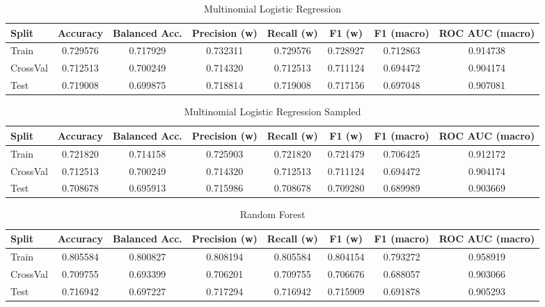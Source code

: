 \begin{table}[H]
	\centering
	\caption{Multinomial Logistic Regression}
	\begin{adjustbox}{max width=\textwidth}
		\begin{tabular}{lccccccc}
			\toprule
			Split & Accuracy & Balanced Acc. & Precision (w) & Recall (w) & F1 (w) & F1 (macro) & ROC AUC (macro) \\
			\midrule
			Train & 0.729576 & 0.717929 & 0.732311 & 0.729576 & 0.728927 & 0.712863 & 0.914738 \\
			CrossVal & 0.712513 & 0.700249 & 0.714320 & 0.712513 & 0.711124 & 0.694472 & 0.904174 \\
			Test & 0.719008 & 0.699875 & 0.718814 & 0.719008 & 0.717156 & 0.697048 & 0.907081 \\
			\bottomrule
		\end{tabular}
	\end{adjustbox}
\end{table}

\begin{table}[H]
	\centering
	\caption{Multinomial Logistic Regression Sampled}
	\begin{adjustbox}{max width=\textwidth}
		\begin{tabular}{lccccccc}
			\toprule
			Split & Accuracy & Balanced Acc. & Precision (w) & Recall (w) & F1 (w) & F1 (macro) & ROC AUC (macro) \\
			\midrule
			Train & 0.721820 & 0.714158 & 0.725903 & 0.721820 & 0.721479 & 0.706425 & 0.912172 \\
			CrossVal & 0.712513 & 0.700249 & 0.714320 & 0.712513 & 0.711124 & 0.694472 & 0.904174 \\
			Test & 0.708678 & 0.695913 & 0.715986 & 0.708678 & 0.709280 & 0.689989 & 0.903669 \\
			\bottomrule
		\end{tabular}
	\end{adjustbox}
\end{table}

\begin{table}[H]
	\centering
	\caption{Random Forest}
	\begin{adjustbox}{max width=\textwidth}
		\begin{tabular}{lccccccc}
			\toprule
			Split & Accuracy & Balanced Acc. & Precision (w) & Recall (w) & F1 (w) & F1 (macro) & ROC AUC (macro) \\
			\midrule
			Train & 0.805584 & 0.800827 & 0.808194 & 0.805584 & 0.804154 & 0.793272 & 0.958919 \\
			CrossVal & 0.709755 & 0.693399 & 0.706201 & 0.709755 & 0.706676 & 0.688057 & 0.903066 \\
			Test & 0.716942 & 0.697227 & 0.717294 & 0.716942 & 0.715909 & 0.691878 & 0.905293 \\
			\bottomrule
		\end{tabular}
	\end{adjustbox}
\end{table}

